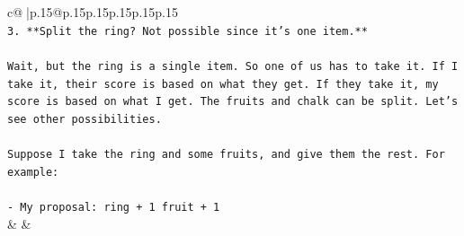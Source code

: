 \documentclass{article}
\begin{document}
{\begin{supertabular}{c@{$\;$}|p{.15\linewidth}@{}p{.15\linewidth}p{.15\linewidth}p{.15\linewidth}p{.15\linewidth}p{.15\linewidth}}
{{{\\ 
\texttt{3. **Split the ring? Not possible since it's one item.**} \\
\\ 
\texttt{Wait, but the ring is a single item. So one of us has to take it. If I take it, their score is based on what they get. If they take it, my score is based on what I get. The fruits and chalk can be split. Let's see other possibilities.} \\
\\ 
\texttt{Suppose I take the ring and some fruits, and give them the rest. For example:} \\
\\ 
\texttt{{-} My proposal: ring + 1 fruit + 1} \\
            }
        }
    }
    & & \\ \\


\end{supertabular}}
\end{document}
